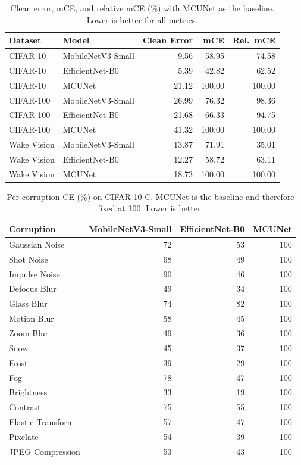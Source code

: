 \documentclass[runningheads]{llncs}
\begin{document}
\begin{table}[t]
\caption{Clean error, mCE, and relative mCE (\%) with MCUNet as the baseline. Lower is better for all metrics.}
\label{tab:robustness_summary}
\centering
\small
\setlength{\tabcolsep}{4pt}
\begin{tabular}{llrrr}
\toprule
Dataset & Model & Clean Error & mCE & Rel.\ mCE \\
\midrule
CIFAR-10 & MobileNetV3-Small & 9.56 & 58.95 & 74.58 \\
CIFAR-10 & EfficientNet-B0 & 5.39 & 42.82 & 62.52 \\
CIFAR-10 & MCUNet & 21.12 & 100.00 & 100.00 \\
CIFAR-100 & MobileNetV3-Small & 26.99 & 76.32 & 98.36 \\
CIFAR-100 & EfficientNet-B0 & 21.68 & 66.33 & 94.75 \\
CIFAR-100 & MCUNet & 41.32 & 100.00 & 100.00 \\
Wake Vision & MobileNetV3-Small & 13.87 & 71.91 & 35.01 \\
Wake Vision & EfficientNet-B0 & 12.27 & 58.72 & 63.11 \\
Wake Vision & MCUNet & 18.73 & 100.00 & 100.00 \\
\bottomrule
\end{tabular}
\end{table}

\begin{table}[p]
\caption{Per-corruption CE (\%) on CIFAR-10-C. MCUNet is the baseline and therefore fixed at 100. Lower is better.}
\label{tab:cifar10_ce}
\centering
\scriptsize
\begin{tabular}{lrrr}
\toprule
Corruption & MobileNetV3-Small & EfficientNet-B0 & MCUNet \\
\midrule
Gaussian Noise & 72 & 53 & 100 \\
Shot Noise & 68 & 49 & 100 \\
Impulse Noise & 90 & 46 & 100 \\
Defocus Blur & 49 & 34 & 100 \\
Glass Blur & 74 & 82 & 100 \\
Motion Blur & 58 & 45 & 100 \\
Zoom Blur & 49 & 36 & 100 \\
Snow & 45 & 37 & 100 \\
Frost & 39 & 29 & 100 \\
Fog & 78 & 47 & 100 \\
Brightness & 33 & 19 & 100 \\
Contrast & 75 & 55 & 100 \\
Elastic Transform & 57 & 47 & 100 \\
Pixelate & 54 & 39 & 100 \\
JPEG Compression & 53 & 43 & 100 \\
\bottomrule
\end{tabular}
\end{table}
\end{document}
